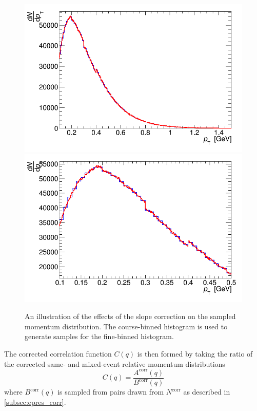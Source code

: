 \begin{figure}[htb]
\centering
\includegraphics[width=.49\linewidth]{testMomHistSampler.png}
\includegraphics[width=.49\linewidth]{testMomHistSamplerZoom.png}\\
\caption{An illustration of the effects of the \pt slope correction on the sampled momentum distribution. The course-binned histogram is used to generate samples for the fine-binned histogram.}
\label{fig:sample_slope_corr}
\end{figure}

The corrected correlation function $C(q)$ is then formed by taking the ratio of the corrected same- and mixed-event relative momentum distributions
\begin{equation}
  C(q) = \frac{A^\textrm{corr}(q)}{B^\textrm{corr}(q)}
\end{equation}
where $B^\textrm{corr}(q)$ is sampled from pairs drawn from $N^\textrm{corr}$ as described in \cref{subsec:epres_corr}.


